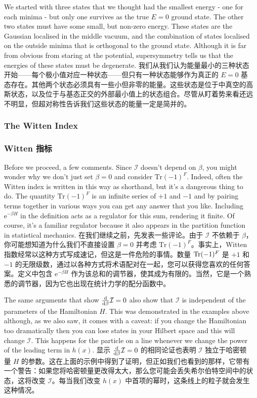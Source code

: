 \documentclass{article}
\newcommand{\rme}{\mathrm{e}}
\begin{document}
\begin{paracol}{2}
We started with three states that we thought had the smallest energy - one for each minima - but only one survives as the true $E = 0$ ground state. The other two states must have some small, but non-zero energy. These states are the Gaussian localised in the middle vacuum, and the combination of states localised on the outside minima that is orthogonal to the ground state. Although it is far from obvious from staring at the potential, supersymmetry tells us that the energies of these states must be degenerate.
\switchcolumn
我们从我们认为能量最小的三种状态开始——每个极小值对应一种状态——但只有一种状态能够作为真正的 $E = 0$ 基态存在。其他两个状态必须具有一些小但非零的能量。这些状态是位于中真空的高斯状态，以及位于与基态正交的外部最小值上的状态组合。尽管从盯着势来看还远不明显，但超对称性告诉我们这些状态的能量一定是简并的。
\switchcolumn*

\subsubsection{The Witten Index}
\switchcolumn
\subsubsection*{Witten 指标}
\switchcolumn*

Before we proceed, a few comments. Since $\mathcal{I}$ doesn't depend on $\beta$, you might wonder why we don't just set $\beta = 0$ and consider $\mathrm{Tr} (-1)^F$. Indeed, often the Witten index is written in this way as shorthand, but it's a dangerous thing to do. The quantity $\mathrm{Tr} (-1)^F$ is an infinite series of $+ 1$ and $- 1$ and by pairing terms together in various ways you can get any answer that you like. Including $\rme^{- \beta H}$ in the definition acts as a regulator for this sum, rendering it finite. Of course, it's a familiar regulator because it also appears in the partition function in statistical mechanics.
\switchcolumn
在我们继续之前，先发表一些评论。由于 $\mathcal{I}$ 不依赖于 $\beta$，你可能想知道为什么我们不直接设置 $\beta = 0$ 并考虑 $\mathrm{Tr} (-1)^F$。事实上，Witten 指数经常以这种方式写成速记，但这是一件危险的事情。数量 $\operatorname{Tr} (-1)^F$ 是 $+ 1$ 和 $- 1$ 的无限级数，通过以各种方式将术语配对在一起，您可以获得您喜欢的任何答案。定义中包含 $\rme^{- \beta H}$ 作为该总和的调节器，使其成为有限的。当然，它是一个熟悉的调节器，因为它也出现在统计力学的配分函数中。
\switchcolumn*

The same arguments that show $\odv*{\mathcal{I}}{\beta} = 0$ also show that $\mathcal{I}$ is independent of the parameters of the Hamiltonian $H$. This was demonstrated in the examples above although, as we also saw, it comes with a caveat: if you change the Hamiltonian too dramatically then you can lose states in your Hilbert space and this will change $\mathcal{I}$. This happens for the particle on a line whenever we change the power of the leading term in $h(x)$.
\switchcolumn
显示 $\odv*{\mathcal{I}}{\beta} = 0$ 的相同论证也表明 $\mathcal{I}$ 独立于哈密顿量 $H$ 的参数。这在上面的示例中得到了证明，但正如我们也看到的那样，它带有一个警告：如果您将哈密顿量更改得太大，那么您可能会丢失希尔伯特空间中的状态，这将改变 $\mathcal{I}$。每当我们改变 $h(x)$ 中首项的幂时，这条线上的粒子就会发生这种情况。
\switchcolumn*


\end{paracol}
\end{document}
